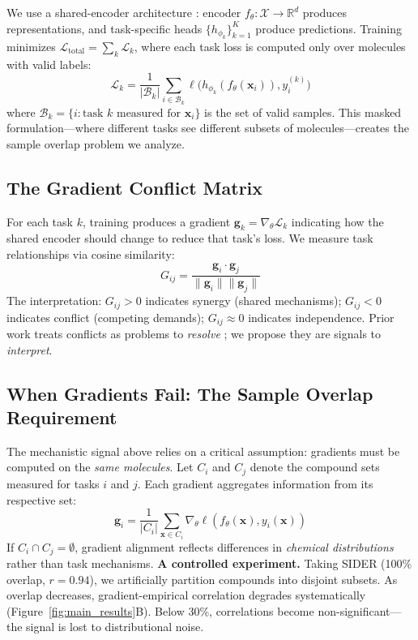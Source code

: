 \documentclass{article}
\newcommand{\loss}{\mathcal{L}}
\begin{document}
We use a shared-encoder architecture \citep{caruana1997multitask, ruder2017overview}: encoder $f_\theta: \mathcal{X} \rightarrow \mathbb{R}^d$ produces representations, and task-specific heads $\{h_{\phi_k}\}_{k=1}^K$ produce predictions. Training minimizes $\loss_{\text{total}} = \sum_{k} \loss_k$, where each task loss is computed only over molecules with valid labels:
\begin{equation}
    \loss_k = \frac{1}{|\mathcal{B}_k|} \sum_{i \in \mathcal{B}_k} \ell\bigl(h_{\phi_k}(f_\theta(\mathbf{x}_i)), y_i^{(k)}\bigr)
\end{equation}%
where $\mathcal{B}_k = \{i : \text{task } k \text{ measured for } \mathbf{x}_i\}$ is the set of valid samples. This masked formulation---where different tasks see different subsets of molecules---creates the sample overlap problem we analyze.

\subsection{The Gradient Conflict Matrix}

For each task $k$, training produces a gradient $\mathbf{g}_k = \nabla_\theta \loss_k$ indicating how the shared encoder should change to reduce that task's loss. We measure task relationships via cosine similarity:
\begin{equation}
    G_{ij} = \frac{\mathbf{g}_i \cdot \mathbf{g}_j}{\|\mathbf{g}_i\| \|\mathbf{g}_j\|}
\end{equation}%
The interpretation: $G_{ij} > 0$ indicates synergy (shared mechanisms); $G_{ij} < 0$ indicates conflict (competing demands); $G_{ij} \approx 0$ indicates independence. Prior work treats conflicts as problems to \textit{resolve} \citep{yu2020gradient, chen2018gradnorm}; we propose they are signals to \textit{interpret}.

\subsection{When Gradients Fail: The Sample Overlap Requirement}

The mechanistic signal above relies on a critical assumption: gradients must be computed on the \textit{same molecules}. Let $C_i$ and $C_j$ denote the compound sets measured for tasks $i$ and $j$. Each gradient aggregates information from its respective set:
\begin{equation}
    \mathbf{g}_i = \frac{1}{|C_i|} \sum_{\mathbf{x} \in C_i} \nabla_\theta \ell(f_\theta(\mathbf{x}), y_i(\mathbf{x}))
\end{equation}%
If $C_i \cap C_j = \emptyset$, gradient alignment reflects differences in \textit{chemical distributions} rather than task mechanisms.
\textbf{A controlled experiment.} Taking SIDER (100\% overlap, $r = 0.94$), we artificially partition compounds into disjoint subsets. As overlap decreases, gradient-empirical correlation degrades systematically (Figure~\ref{fig:main_results}B). Below 30\%, correlations become non-significant---the signal is lost to distributional noise.
\end{document}
